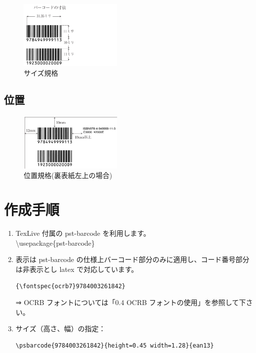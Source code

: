 \documentclass[a5j,tombo,10pt,titlepage,pdfusetitle]{ltjsbook}
\def\fs#1#2{\fontsize{#1}{#2}\selectfont }
\begin{document}
{\begin{figure}[H]
\centering
\includegraphics[width=5cm,angle=0]{./images/isbn-layout01.png}
\caption{サイズ規格} 
\end{figure}

\subsection{位置} 

\begin{figure}[H]
\centering
\includegraphics[width=5cm,angle=0]{./images/isbn-layout02.png}
\caption{位置規格(裏表紙左上の場合)} 
\end{figure}


\newpage
\thispagestyle{empty}

\section{作成手順}   

\begin{enumerate}
  \item TexLive 付属の pst-barcode を利用します。\\
  \textbackslash usepackage\{pst-barcode\}
  
  \item 表示は pst-barcode の仕様上バーコード部分のみに適用し、コード番号部分は非表示とし latex で対応しています。\vspace{-2mm}
\begin{verbatim}
{\fontspec{ocrb7}9784003261842}
\end{verbatim}\vspace{-2mm}
{\fs{8}{8}⇒ OCRB フォントについては「0.4 OCRB フォントの使用」を参照して下さい。}

  \item サイズ（高さ、幅）の指定：\vspace{-2mm}
\begin{verbatim}
\psbarcode{9784003261842}{height=0.45 width=1.28}{ean13}
\end{verbatim}\vspace{-2mm}


\end{enumerate}}
\end{document}
